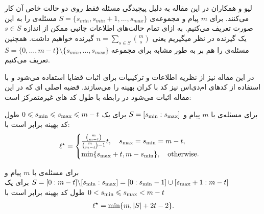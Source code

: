 لیو و همکاران در این مقاله به دلیل پیچیدگی مسئله فقط روی دو حالت خاص آن کار می‌کنند. برای 
$m$
پیام و مجموعه‌ی
$S = \{s_{min}, s_{min }+ 1, \ldots, s_{max}\}$
مسئله‌ی 
را به این صورت تعریف می‌کنیم. به ازای تمام حالت‌های اطلاعات جانبی ممکن از اندازه
$s \in S$
یک گیرنده در نظر میگیریم یعنی
$n = \sum\limits_{s \in S} \binom{m}{s}$
گیرنده خواهیم داشت. همچنین مسئله‌ی
را هم بر به طور مشابه برای مجموعه
$S = \{0, \ldots, m - t\} \setminus \{s_{min}, \ldots, s_{max}\}$
تعریف می‌کنیم.

در این مقاله نیز از نظریه اطلاعات و ترکیبیات برای اثبات قضایا استفاده می‌شود و با استفاده از کدهای ام‌دی‌اس نیز کد با کران بهینه را می‌سازند. قضیه اصلی ای که در این مقاله اثبات می‌شود در رابطه با طول کد های غیرمتمرکز است:
\begin{theorem}[consecutive]
	\label{thm:consecutive_s}
	برای مسئله‌ی
	با
	$m$ 
	پیام و
	  $S=[s_{\rm min}:s_{\rm max}]$
	  برای یک
	  $0\leqslant s_{\rm min} \leqslant s_{\rm max} \leqslant m-t$
	  طول کد بهینه برابر است با:
	\begin{align}
		\ell^{\star}=\begin{cases}
			\frac{\binom{m}{m-t}}{\binom{m}{m-t}-1}  t, \quad s_{\rm max}=s_{\rm min}=m-t,\\
			\min\{s_{\rm max}+t, m-s_{\rm min}\}, \quad \text{otherwise.}
		\end{cases}
		\label{eq:thm:consecutive_s}
	\end{align}
\end{theorem}


\begin{theorem}[complement-consecutive]
	\label{thm:complement_consecutive_s}
	برای مسئله‌ی
با
 $m$ 
 پیام
 و
 $S=[0:m-t]\backslash [s_{\rm min}:s_{\rm max}] = [0:s_{\rm min}-1]\cup[s_{\rm max}+1:m-t]$
 برای یک
 $0 < s_{\rm min} \leqslant s_{\rm max} < m-t$
 طول کد بهینه برابر است با
	\begin{align}
		\ell^{\star}=\min\{m,|S|+2t-2\}.
		\label{eq:thm:complement_consecutive_s}
	\end{align}
\end{theorem}

